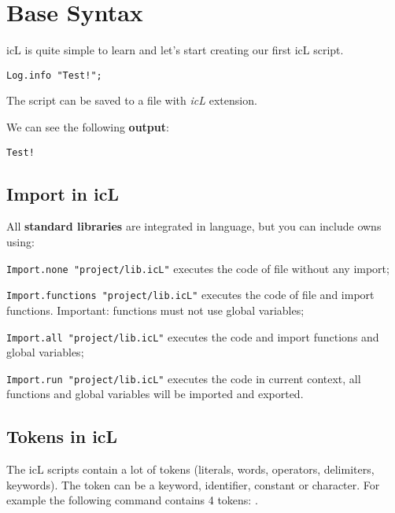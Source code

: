 

\section{Base Syntax}

icL is quite simple to learn and let's start creating our first icL script.
\begin{verbatim}
Log.info "Test!";
\end{verbatim}

The script can be saved to a file with \textit{icL} extension.

We can see the following \textbf{output}:

\begin{verbatim}
Test!
\end{verbatim}

\subsection{Import in icL}

All \textbf{standard libraries} are integrated in language, but you can include owns using:

\begin{icItems}
\item
	\texttt{Import.none "project/lib.icL"} executes the code of file without any import;
\item
	\texttt{Import.functions "project/lib.icL"} executes the code of file and import functions. {\color{red}Important:} functions must not use global variables;
\item
	\texttt{Import.all "project/lib.icL"} executes the code and import functions and global variables;
\item
	\texttt{Import.run "project/lib.icL"} executes the code in current context, all functions and global variables will be imported and exported.
\end{icItems}

\subsection{Tokens in icL}

The icL scripts contain a lot of tokens (literals, words, operators, delimiters, keywords). The token can be a keyword, identifier, constant or character. For example the following command contains 4 tokens: .

